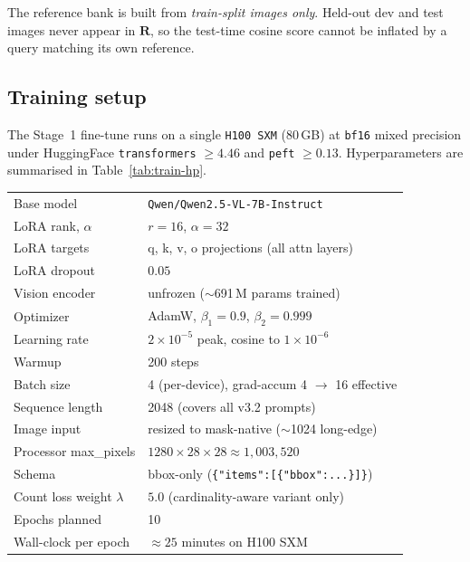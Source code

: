 The reference bank is built from \emph{train-split images only}. Held-out
dev and test images never appear in $\mathbf{R}$, so the test-time cosine
score cannot be inflated by a query matching its own reference.

\subsection{Training setup}
\label{sec:st:train}

The Stage~1 fine-tune runs on a single \texttt{H100 SXM} (80\,GB) at
\texttt{bf16} mixed precision under HuggingFace \texttt{transformers}
$\geq 4.46$ and \texttt{peft} $\geq 0.13$. Hyperparameters are summarised
in Table~\ref{tab:train-hp}.

\begin{table}[t]
\centering\small
\begin{tabular}{ll}
\toprule
Base model               & \texttt{Qwen/Qwen2.5-VL-7B-Instruct} \\
LoRA rank, $\alpha$      & $r{=}16$, $\alpha{=}32$ \\
LoRA targets             & q, k, v, o projections (all attn layers) \\
LoRA dropout             & $0.05$ \\
Vision encoder           & unfrozen ($\sim$691\,M params trained) \\
Optimizer                & AdamW, $\beta_1{=}0.9$, $\beta_2{=}0.999$ \\
Learning rate            & $2 \times 10^{-5}$ peak, cosine to $1\times 10^{-6}$ \\
Warmup                   & 200 steps \\
Batch size               & 4 (per-device), grad-accum 4 $\rightarrow$ 16 effective \\
Sequence length          & 2048 (covers all v3.2 prompts) \\
Image input              & resized to mask-native ($\sim$1024 long-edge) \\
Processor max\_pixels    & $1280 \times 28 \times 28 \approx 1{,}003{,}520$ \\
Schema                   & bbox-only (\texttt{\{"items":[\{"bbox":...\}]\}}) \\
Count loss weight $\lambda$ & $5.0$ (cardinality-aware variant only) \\
Epochs planned           & 10 \\
Wall-clock per epoch     & $\approx 25$ minutes on H100 SXM \\

\end{tabular}
\end{table}
